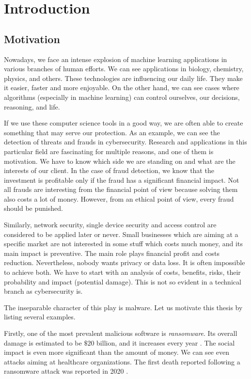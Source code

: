 \chapter{Introduction} \label{chap:intro}
\section*{Motivation}
Nowadays, we face an intense explosion of machine learning applications in various branches of human efforts. We can see applications in biology, chemistry, physics, and others. These technologies are influencing our daily life. They make it easier, faster and more enjoyable. On the other hand, we can see cases where algorithms (especially in machine learning) can control ourselves, our decisions, reasoning, and life.

If we use these computer science tools in a good way, we are often able to create something that may serve our protection. As an example, we can see the detection of threats and frauds in cybersecurity. Research and applications in this particular field are fascinating for multiple reasons, and one of them is motivation. We have to know which side we are standing on and what are the interests of our client.  In the case of fraud detection, we know that the investment is profitable only if the fraud has a significant financial impact. Not all frauds are interesting from the financial point of view because solving them also costs a lot of money. However, from an ethical point of view, every fraud should be punished. 

Similarly, network security, single device security and access control are considered to be applied later or never. Small businesses which are aiming at a specific market are not interested in some stuff which costs much money, and its main impact is preventive. The main role plays financial profit and costs reduction. Nevertheless, nobody wants privacy or data loss. It is often impossible to achieve both. We have to start with an analysis of costs, benefits, risks, their probability and impact (potential damage). This is not so evident in a technical branch as cybersecurity is.

The inseparable character of this play is malware. Let us motivate this thesis by listing several examples.

Firstly, one of the most prevalent malicious software is \emph{ransomware}. Its overall damage is estimated to be $\$20$ billion, and it increases every year \cite{purplesec2021}. The social impact is even more significant than the amount of money. We can see even attacks aiming at healthcare organizations. The first death reported following a ransomware attack was reported in 2020 \cite{Cimpanu2020}.

